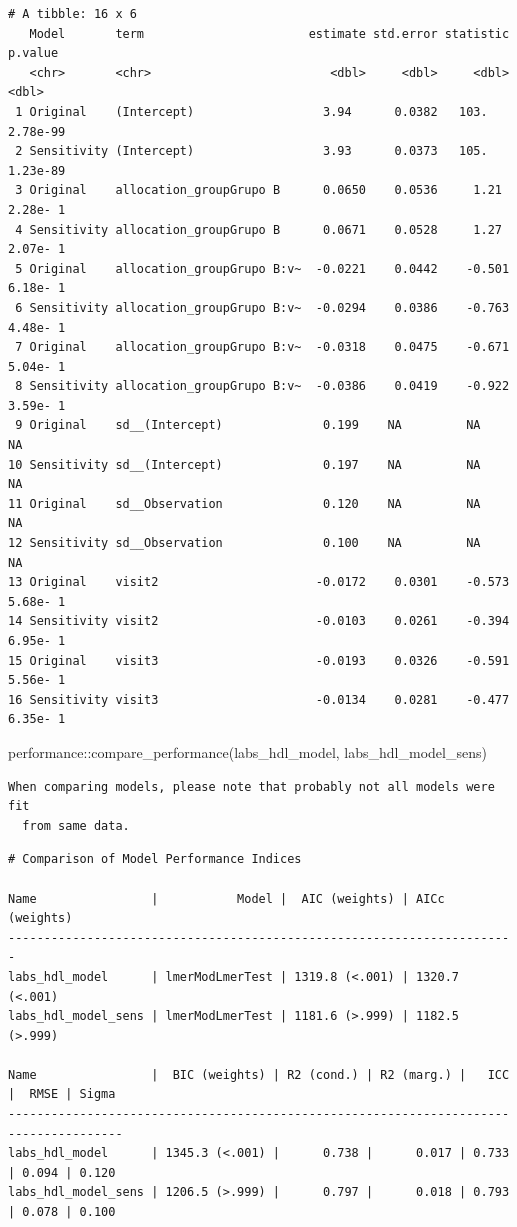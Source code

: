 \documentclass[
  letterpaper,
  DIV=11,
  numbers=noendperiod]{scrartcl}
\newenvironment{Shaded}{\begin{snugshade}}{\end{snugshade}}
\newcommand{\FunctionTok}[1]{\textcolor[rgb]{0.28,0.35,0.67}{#1}}
\newcommand{\NormalTok}[1]{\textcolor[rgb]{0.00,0.23,0.31}{#1}}
\newcommand{\SpecialCharTok}[1]{\textcolor[rgb]{0.37,0.37,0.37}{#1}}
\begin{document}
\begin{verbatim}
# A tibble: 16 x 6
   Model       term                       estimate std.error statistic   p.value
   <chr>       <chr>                         <dbl>     <dbl>     <dbl>     <dbl>
 1 Original    (Intercept)                  3.94      0.0382   103.     2.78e-99
 2 Sensitivity (Intercept)                  3.93      0.0373   105.     1.23e-89
 3 Original    allocation_groupGrupo B      0.0650    0.0536     1.21   2.28e- 1
 4 Sensitivity allocation_groupGrupo B      0.0671    0.0528     1.27   2.07e- 1
 5 Original    allocation_groupGrupo B:v~  -0.0221    0.0442    -0.501  6.18e- 1
 6 Sensitivity allocation_groupGrupo B:v~  -0.0294    0.0386    -0.763  4.48e- 1
 7 Original    allocation_groupGrupo B:v~  -0.0318    0.0475    -0.671  5.04e- 1
 8 Sensitivity allocation_groupGrupo B:v~  -0.0386    0.0419    -0.922  3.59e- 1
 9 Original    sd__(Intercept)              0.199    NA         NA     NA       
10 Sensitivity sd__(Intercept)              0.197    NA         NA     NA       
11 Original    sd__Observation              0.120    NA         NA     NA       
12 Sensitivity sd__Observation              0.100    NA         NA     NA       
13 Original    visit2                      -0.0172    0.0301    -0.573  5.68e- 1
14 Sensitivity visit2                      -0.0103    0.0261    -0.394  6.95e- 1
15 Original    visit3                      -0.0193    0.0326    -0.591  5.56e- 1
16 Sensitivity visit3                      -0.0134    0.0281    -0.477  6.35e- 1
\end{verbatim}

\begin{Shaded}
\begin{Highlighting}[]
\NormalTok{performance}\SpecialCharTok{::}\FunctionTok{compare\_performance}\NormalTok{(labs\_hdl\_model, labs\_hdl\_model\_sens)}
\end{Highlighting}
\end{Shaded}

\begin{verbatim}
When comparing models, please note that probably not all models were fit
  from same data.
\end{verbatim}

\begin{verbatim}
# Comparison of Model Performance Indices

Name                |           Model |  AIC (weights) | AICc (weights)
-----------------------------------------------------------------------
labs_hdl_model      | lmerModLmerTest | 1319.8 (<.001) | 1320.7 (<.001)
labs_hdl_model_sens | lmerModLmerTest | 1181.6 (>.999) | 1182.5 (>.999)

Name                |  BIC (weights) | R2 (cond.) | R2 (marg.) |   ICC |  RMSE | Sigma
--------------------------------------------------------------------------------------
labs_hdl_model      | 1345.3 (<.001) |      0.738 |      0.017 | 0.733 | 0.094 | 0.120
labs_hdl_model_sens | 1206.5 (>.999) |      0.797 |      0.018 | 0.793 | 0.078 | 0.100
\end{verbatim}
\end{document}
